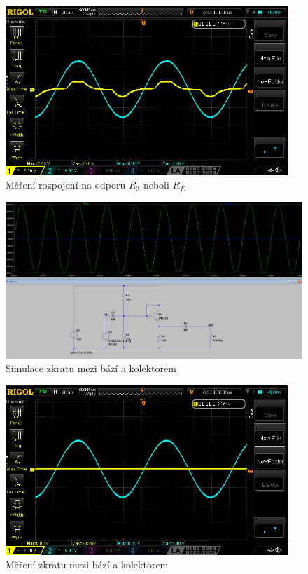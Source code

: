 \documentclass{article}
\begin{document}
\begin{figure}[H]
  \centering
  \includegraphics[width=0.95\textwidth]{mereni/NewFolder1/NewFile10.png}
  \caption{Měření rozpojení na odporu \(R_3\) neboli \(R_{E}\)}
  \label{fig:m-sch-sc-p3}
\end{figure}


\begin{figure}[H]
  \centering
  \includegraphics[width=\textwidth]{sim/ukol2/porucha3.png}
  \caption{Simulace zkratu mezi bází a kolektorem}
  \label{fig:sch-sc-p4}
\end{figure}

\begin{figure}[H]
  \centering
  \includegraphics[width=0.95\textwidth]{mereni/NewFolder1/NewFile13.png}
  \caption{Měření zkratu mezi bází a kolektorem}
  \label{fig:m-sch-sc-p4}
\end{figure}
\end{document}
